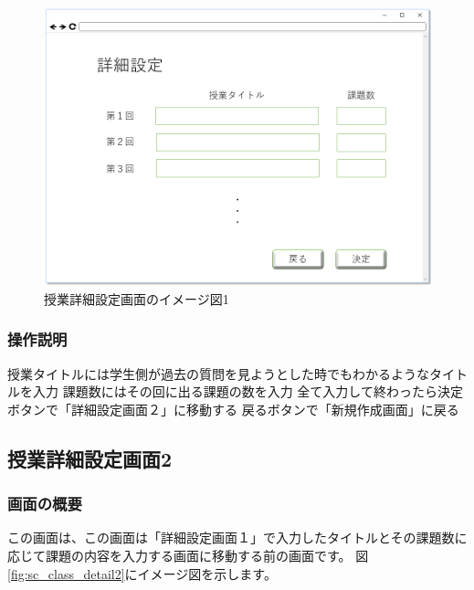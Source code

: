 \begin{figure}[htbp]
\begin{center}
  \includegraphics[width=1\linewidth,clip]{./img/sc_class_detail1.png}
  \caption{授業詳細設定画面のイメージ図1}\label{fig:sc_class_detail1}
\end{center}
\end{figure}

\subsubsection{操作説明}
授業タイトルには学生側が過去の質問を見ようとした時でもわかるようなタイトルを入力
課題数にはその回に出る課題の数を入力
全て入力して終わったら決定ボタンで「詳細設定画面２」に移動する
戻るボタンで「新規作成画面」に戻る

\newpage

\subsection{授業詳細設定画面2}
\subsubsection{画面の概要}
この画面は、この画面は「詳細設定画面１」で入力したタイトルとその課題数に応じて課題の内容を入力する画面に移動する前の画面です。
図\ref{fig:sc_class_detail2}にイメージ図を示します。

